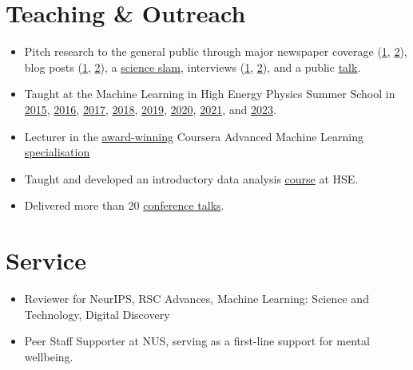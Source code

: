 \documentclass[11pt,a4paper]{article}
\begin{document}
\section{Teaching \& Outreach}
\begin{itemize}
  \item Pitch research to the general public through major newspaper coverage (\href{https://www.kommersant.ru/doc/7832307}{1}, \href{https://www.kommersant.ru/doc/6122817}{2}), blog posts (\href{https://ifim.nus.edu.sg/tailor-made-2d-materials-became-closer-with-the-new-machine-learning-algorithm-developed-at-nus/}{1}, \href{https://communities.springernature.com/posts/sparse-representation-for-machine-learning-the-properties-of-defects-in-2d-materials}{2}), a \href{https://elementy.ru/events/435506/IV\_Nauchnye\_boi\_NIU\_VShE\_na\_Dne\_Vyshki}{science slam}, interviews (\href{https://web.archive.org/web/20210518043835/https://academy.yandex.ru/posts/beresh-i-razbiraeshsya}{1}, \href{https://habr.com/en/company/yandex/blog/422761/}{2}), and a public \href{https://www.youtube.com/watch?v=zLFZ\_z-7-JI&feature=youtu.be&t=7779}{talk}.
  \item Taught at the Machine Learning in High Energy Physics Summer School in \href{https://indico.cern.ch/event/439520/}{2015}, \href{https://indico.cern.ch/event/497368/}{2016}, \href{https://indico.cern.ch/event/613571/}{2017}, \href{https://indico.cern.ch/event/687473/}{2018}, \href{https://indico.cern.ch/event/768915/}{2019}, \href{https://indico.cern.ch/event/838377/}{2020}, \href{https://indico.cern.ch/event/1025052/}{2021}, and \href{https://indico.cern.ch/event/1229514/}{2023}.
  \item Lecturer in the \href{https://www.hse.ru/en/news/edu/259378493.html}{award-winning} Coursera Advanced Machine Learning \href{https://web.archive.org/web/20220127183223/https://www.coursera.org/specializations/aml}{  specialisation}
  \item Taught and developed an introductory data analysis \href{https://we.hse.ru/en/}{course} at HSE.
  \item Delivered more than 20 \href{https://docs.google.com/document/d/1IOlBse4q0YgEoL\_RCJTvJfbFhFaD\_YMAIJJ3W77B\_X0/edit?usp=sharing}{conference talks}.
\end{itemize}
\section{Service}
\begin{itemize}
  \item Reviewer for NeurIPS, RSC Advances, Machine Learning: Science and Technology, Digital Discovery
  \item Peer Staff Supporter at NUS, serving as a first-line support for mental wellbeing.
\end{itemize}
\end{document}
